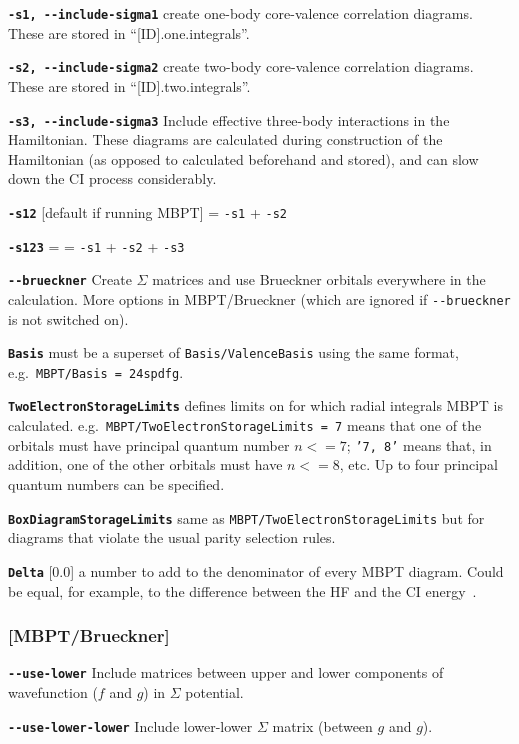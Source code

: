 \documentclass[a4paper,11pt]{article}
\newcommand{\option}[1]{\smallskip\noindent\textbf{\texttt{#1}}}
\newcommand{\code}[1]{\texttt{#1}}
\begin{document}
\option{-s1, -{}-include-sigma1} create one-body core-valence correlation diagrams. These are stored in ``[ID].one.integrals''.

\option{-s2, -{}-include-sigma2} create two-body core-valence correlation diagrams. These are stored in ``[ID].two.integrals''.

\option{-s3, -{}-include-sigma3} Include effective three-body interactions in the Hamiltonian. These diagrams are calculated during construction of the Hamiltonian (as opposed to calculated beforehand and stored), and can slow down the CI process considerably.

\option{-s12} [default if running MBPT] = \texttt{-s1} + \texttt{-s2}

\option{-s123} = = \texttt{-s1} + \texttt{-s2} + \texttt{-s3}

\option{-{}-brueckner} Create $\Sigma$ matrices and use Brueckner orbitals everywhere in the calculation. More options in MBPT/Brueckner (which are ignored if \texttt{-{}-brueckner} is not switched on).

\option{Basis} must be a superset of \code{Basis/ValenceBasis} using the same format, e.g.~\code{MBPT/Basis = 24spdfg}.

\option{TwoElectronStorageLimits} defines limits on for which radial integrals MBPT is calculated. e.g.~\code{MBPT/TwoElectronStorageLimits = 7} means that one of the orbitals must have principal quantum number $n <= 7$; \code{'7, 8'} means that, in addition, one of the other orbitals must have $n <= 8$, etc. Up to four principal quantum numbers can be specified.

\option{BoxDiagramStorageLimits} same as \texttt{MBPT/TwoElectronStorageLimits} but for diagrams that violate the usual parity selection rules.

\option{Delta} [0.0] a number to add to the denominator of every MBPT diagram. Could be equal, for example, to the difference between the HF and the CI energy~\cite{kozlov99os,berengut08jpb}.

\subsubsection{[MBPT/Brueckner]}

\option{-{}-use-lower} Include matrices between upper and lower components of wavefunction ($f$ and $g$) in $\Sigma$ potential.

\option{-{}-use-lower-lower} Include lower-lower $\Sigma$ matrix (between $g$ and $g$).
\end{document}
